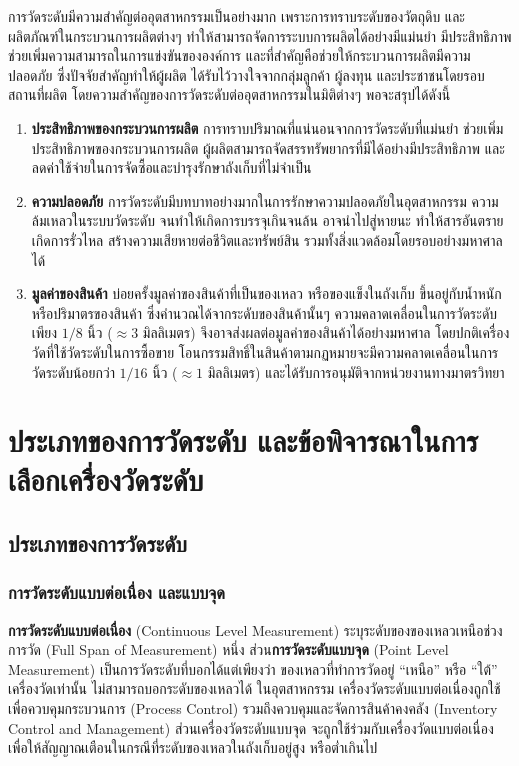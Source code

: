 \documentclass[final,11pt]{article}
\begin{document}
การวัดระดับมีความสำคัญต่ออุตสาหกรรมเป็นอย่างมาก เพราะการทราบระดับของวัตถุดิบ และผลิตภัณฑ์ในกระบวนการผลิตต่างๆ
ทำให้สามารถจัดการระบบการผลิตได้อย่างมีแม่นยำ มีประสิทธิภาพ ช่วยเพิ่มความสามารถในการแข่งขันขององค์การ 
และที่สำคัญคือช่วยให้กระบวนการผลิตมีความปลอดภัย ซึ่งปัจจัยสำคัญทำให้ผู้ผลิต ได้รับไว้วางใจจากกลุ่มลูกค้า ผู้ลงทุน และประชาชนโดยรอบสถานที่ผลิต
โดยความสำคัญของการวัดระดับต่ออุตสาหกรรมในมิติต่างๆ พอจะสรุปได้ดังนี้ 
\begin{enumerate}
    \item \textbf{ประสิทธิภาพของกระบวนการผลิต} การทราบปริมาณที่แน่นอนจากการวัดระดับที่แม่นยำ
    ช่วยเพิ่มประสิทธิภาพของกระบวนการผลิต ผู้ผลิตสามารถจัดสรรทรัพยากรที่มีได้อย่างมีประสิทธิภาพ 
    และลดค่าใช้จ่ายในการจัดซื้อและบำรุงรักษาถังเก็บที่ไม่จำเป็น
    \item \textbf{ความปลอดภัย} การวัดระดับมีบทบาทอย่างมากในการรักษาความปลอดภัยในอุตสาหกรรม
    ความล้มเหลวในระบบวัดระดับ จนทำให้เกิดการบรรจุเกินจนล้น อาจนำไปสู่หายนะ ทำให้สารอันตรายเกิดการรั่วไหล
    สร้างความเสียหายต่อชีวิตและทรัพย์สิน รวมทั้งสิ่งแวดล้อมโดยรอบอย่างมหาศาลได้ 
    \item \textbf{มูลค่าของสินค้า} บ่อยครั้งมูลค่าของสินค้าที่เป็นของเหลว หรือของแข็งในถังเก็บ
    ขึ้นอยู่กับน้ำหนัก หรือปริมาตรของสินค้า ซึ่งคำนวณได้จากระดับของสินค้านั้นๆ 
    ความคลาดเคลื่อนในการวัดระดับเพียง $1/8$ นิ้ว ($\approx 3$ มิลลิเมตร) 
    จึงอาจส่งผลต่อมูลค่าของสินค้าได้อย่างมหาศาล โดยปกติเครื่องวัดที่ใช้วัดระดับในการซื้อขาย
    โอนกรรมสิทธิ์ในสินค้าตามกฏหมายจะมีความคลาดเคลื่อนในการวัดระดับน้อยกว่า  $1/16$ นิ้ว ($\approx 1$ มิลลิเมตร)
    และได้รับการอนุมัติจากหน่วยงานทางมาตรวิทยา
\end{enumerate}
\newpage
\section{ประเภทของการวัดระดับ และข้อพิจารณาในการเลือกเครื่องวัดระดับ}
\subsection{ประเภทของการวัดระดับ}
\subsubsection{การวัดระดับแบบต่อเนื่อง และแบบจุด}
\textbf{การวัดระดับแบบต่อเนื่อง} (Continuous Level Measurement) ระบุระดับของของเหลวเหนือช่วงการวัด (Full Span of Measurement)
หนึ่ง ส่วน\textbf{การวัดระดับแบบจุด} (Point Level Measurement) เป็นการวัดระดับที่บอกได้แต่เพียงว่า ของเหลวที่ทำการวัดอยู่ ``เหนือ'' 
หรือ ``ใต้'' เครื่องวัดเท่านั้น ไม่สามารถบอกระดับของเหลวได้ ในอุตสาหกรรม เครื่องวัดระดับแบบต่อเนื่องถูกใช้เพื่อควบคุมกระบวนการ (Process Control)
รวมถึงควบคุมและจัดการสินค้าคงคลัง (Inventory Control and Management) ส่วนเครื่องวัดระดับแบบจุด จะถูกใช้ร่วมกับเครื่องวัดแบบต่อเนื่อง 
เพื่อให้สัญญาณเตือนในกรณีที่ระดับของเหลวในถังเก็บอยู่สูง หรือต่ำเกินไป
\end{document}
